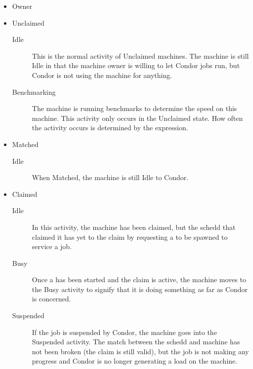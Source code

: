 \begin{itemize}

\item Owner

\item Unclaimed
\begin{description}
\item[Idle] This is the normal activity of Unclaimed machines.
  The machine is still Idle in that the machine owner is willing to
  let Condor jobs run, but Condor is not using the
  machine for anything.
  
\item[Benchmarking] The machine is running benchmarks to
  determine the speed on this machine.
  This activity only occurs in the Unclaimed state.
  How often the activity occurs is
  determined by the  expression.
\end{description}

\item Matched
\begin{description}
\item[Idle] When Matched, the machine is still Idle to Condor.
\end{description}

\item Claimed
\begin{description}
\item[Idle] In this activity, the machine has been claimed, but the
  schedd that claimed it has yet to  the claim by
  requesting a  to be spawned to service a job.
  
\item[Busy] Once a  has been started and the claim is
  active, the machine moves to the Busy activity to signify that it is
  doing something as far as Condor is concerned.
  
\item[Suspended] If the job is suspended by Condor, the machine goes
  into the Suspended activity.
  The match between the schedd and machine has not been broken (the
  claim is still valid), but the job is not making any progress and
  Condor is no longer generating a load on the machine.


\end{description}
\end{itemize}
